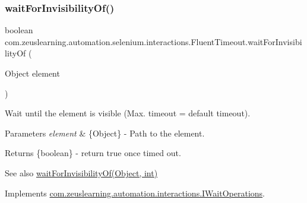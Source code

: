 \subsubsection{\texorpdfstring{wait\+For\+Invisibility\+Of()}{waitForInvisibilityOf()}\hspace{0.1cm}{\footnotesize\ttfamily [1/2]}}
{\footnotesize\ttfamily boolean com.\+zeuslearning.\+automation.\+selenium.\+interactions.\+Fluent\+Timeout.\+wait\+For\+Invisibility\+Of (\begin{DoxyParamCaption}\item[{Object}]{element }\end{DoxyParamCaption})\hspace{0.3cm}{\ttfamily [inline]}}

Wait until the element is visible (Max. timeout = default timeout).


\begin{DoxyParams}{Parameters}
{\em element} & \{Object\} -\/ Path to the element.\\
\hline
\end{DoxyParams}
\begin{DoxyReturn}{Returns}
\{boolean\} -\/ return {\ttfamily true} once timed out.
\end{DoxyReturn}
\begin{DoxySeeAlso}{See also}
\hyperlink{classcom_1_1zeuslearning_1_1automation_1_1selenium_1_1interactions_1_1FluentTimeout_aa8c541ab4503e1c0bb835545e4ad717d}{wait\+For\+Invisibility\+Of(\+Object, int)} 
\end{DoxySeeAlso}


Implements \hyperlink{interfacecom_1_1zeuslearning_1_1automation_1_1interactions_1_1IWaitOperations_a92e178778c5219ee00b59f5d8cdc8f94}{com.\+zeuslearning.\+automation.\+interactions.\+I\+Wait\+Operations}.

\hypertarget{classcom_1_1zeuslearning_1_1automation_1_1selenium_1_1interactions_1_1FluentTimeout_aa8c541ab4503e1c0bb835545e4ad717d}{}\label{classcom_1_1zeuslearning_1_1automation_1_1selenium_1_1interactions_1_1FluentTimeout_aa8c541ab4503e1c0bb835545e4ad717d} 
